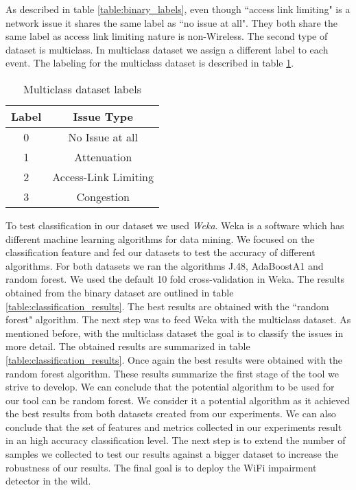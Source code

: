 As described in table \ref{table:binary_labels}, even though ``access link limiting" is a network issue it shares the same label as ``no issue at all". They both share the same label as access link limiting nature is non-Wireless.
The second type of dataset is multiclass. In multiclass dataset we assign a different label to each event. The labeling for the multiclass dataset is described in table \ref{table:multiclass_labels}.

\begin{table}[!h]
	\begin{center}
		\begin{tabular}{||c c||} 
			\hline
			Label & Issue Type\\ [0.5ex] 
			\hline\hline
			0 & No Issue at all \\ 
			\hline
			1 & Attenuation\\
			\hline
			2 & Access-Link Limiting \\
			\hline
			3 & Congestion \\[1ex] 
			\hline
		\end{tabular}
		\caption{Multiclass dataset labels}
		\label{table:multiclass_labels}
	\end{center}
\end{table}

To test classification in our dataset we used \emph{Weka}. Weka is a software which has different machine learning algorithms for data mining. We focused on the classification feature and fed our datasets to test the accuracy of different algorithms. For both datasets we ran the algorithms J.48, AdaBoostA1 and random forest. We used the default 10 fold cross-validation in Weka. The results obtained from the binary dataset are outlined in table \ref{table:classification_results}. The best results are obtained with the ``random forest" algorithm. The next step was to feed Weka with the multiclass dataset. As mentioned before, with the multiclass dataset the goal is to classify the issues in more detail. The obtained results are summarized in table \ref{table:classification_results}. Once again the best results were obtained with the random forest algorithm. 
These results summarize the first stage of the tool we strive to develop. We can conclude that the potential algorithm to be used for our tool can be random forest. We consider it a potential algorithm as it achieved the best results from both datasets created from our experiments. We can also conclude that the set of features and metrics collected in our experiments result in an high accuracy classification level. The next step is to extend the number of samples we collected to test our results against a bigger dataset to increase the robustness of our results. The final goal is to deploy the WiFi impairment detector in the wild.

\newpage


